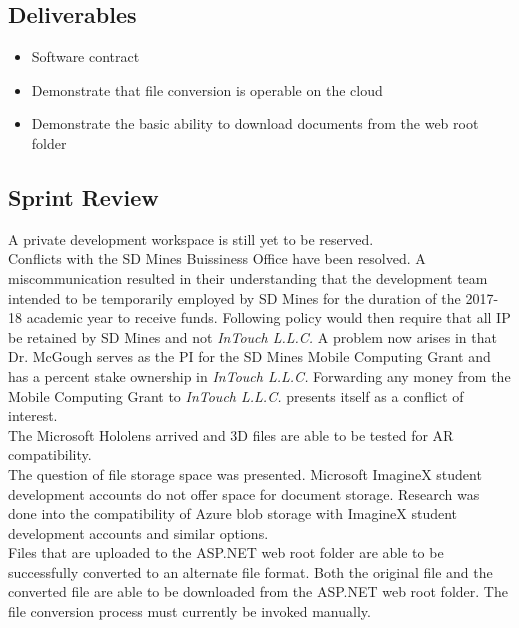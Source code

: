     \subsection{Deliverables}
    \label{sec:Sprint3_deliverables}
        \begin{itemize}
            \item Software contract
            \item Demonstrate that file conversion is operable on the cloud
            \item Demonstrate the basic ability to download documents from the web root folder
        \end{itemize}

    \subsection{Sprint Review}
    \label{sec:Sprint3_review}
        \hspace{7mm}
        A private development workspace is still yet to be reserved.\\

        Conflicts with the SD Mines Buissiness Office have been resolved.  A miscommunication resulted in their
        understanding that the development team intended to be temporarily employed by SD Mines for the duration
        of the 2017-18 academic year to receive funds.  Following policy would then require that all IP be retained
        by SD Mines and not \textit{InTouch L.L.C.}  A problem now arises in that Dr. McGough serves as the PI for
        the SD Mines Mobile Computing Grant and has a percent stake ownership in \textit{InTouch L.L.C.}  Forwarding
        any money from the Mobile Computing Grant to \textit{InTouch L.L.C.} presents itself as a conflict of interest.\\
        
        The Microsoft Hololens arrived and 3D files are able to be tested for AR compatibility.\\

        The question of file storage space was presented.  Microsoft ImagineX student development accounts do not
        offer space for document storage.  Research was done into the compatibility of Azure blob storage with 
        ImagineX student development accounts and similar options.\\
        
        Files that are uploaded to the ASP.NET web root folder are able to be successfully converted to an alternate
        file format.  Both the original file and the converted file are able to be downloaded from the ASP.NET web root
        folder.  The file conversion process must currently be invoked manually.\\

